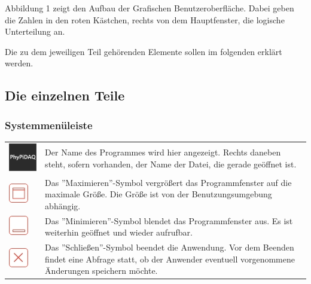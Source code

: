 \documentclass[parskip=full]{scrartcl}
\begin{document}
Abbildung 1 zeigt den Aufbau der Grafischen Benutzeroberfläche. Dabei geben die Zahlen in den roten Kästchen, rechts von dem Hauptfenster, die logische Unterteilung an.

Die zu dem jeweiligen Teil gehörenden Elemente sollen im folgenden erklärt werden.

\subsection{Die einzelnen Teile}

\subsubsection{Systemmenüleiste}

\begin{tabular}[t]{p{1cm} p{10cm}}
	\vspace{0cm}\includegraphics[width = 1 cm]{Grafik/PhyPiDAQ.jpg} & Der Name des Programmes wird hier angezeigt. Rechts daneben steht, sofern vorhanden, der Name der Datei, die gerade geöffnet ist.\newline\\
	\vspace{0cm}\includegraphics[width = 1 cm]{Grafik/Maximieren.jpg} & Das ''Maximieren''-Symbol vergrößert das Programmfenster auf die maximale Größe. Die Größe ist von der Benutzungsumgebung abhängig.\newline\\
	\vspace{0cm}\includegraphics[width = 1 cm]{Grafik/Minimieren.jpg} & Das ''Minimieren''-Symbol blendet das Programmfenster aus. Es ist weiterhin geöffnet und wieder aufrufbar. \\
	\vspace{0cm}\includegraphics[width = 1 cm]{Grafik/Schliessen.jpg} & Das ''Schließen''-Symbol beendet die Anwendung. Vor dem Beenden findet eine Abfrage statt, ob der Anwender eventuell vorgenommene Änderungen speichern möchte.\newline\\
\end{tabular}
\end{document}
